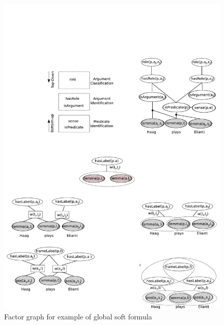\begin{figure}
\begin{center}
   \includegraphics[scale=.80]{GlobalFormula}
\end{center}
\caption{Factor graph for example of global soft formula}
\label{fig:global2}
\end{figure}






